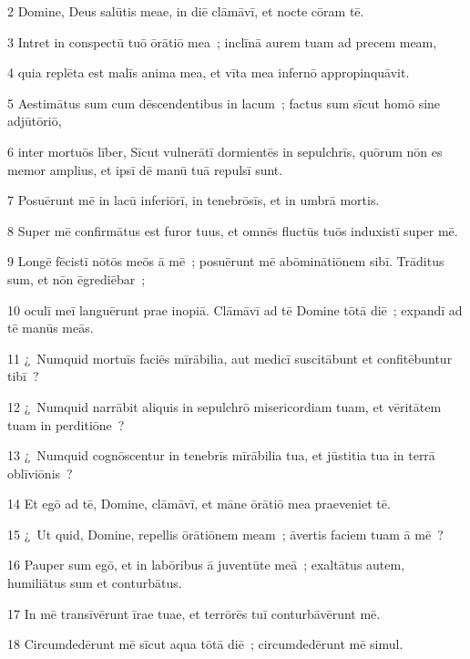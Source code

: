 \psalmVerse
  {\phantom{00}2}
  {Domine, Deus salūtis meae, in diē clāmāvī, et nocte cōram tē.}


\psalmVerse
  {\phantom{00}3}
  {Intret in conspectū tuō ōrātiō mea~; inclīnā aurem tuam ad precem meam,}


\psalmVerse
  {\phantom{00}4}
  {quia replēta est malīs anima mea, et vīta mea infernō appropinquāvit.}


\psalmVerse
  {\phantom{00}5}
  {Aestimātus sum cum dēscendentibus in lacum~; factus sum sīcut homō sine adjūtōriō,}


\psalmVerse
  {\phantom{00}6}
  {inter mortuōs līber, Sīcut vulnerātī dormientēs in sepulchrīs, quōrum nōn es memor amplius, et ipsī dē manū tuā repulsī sunt.}


\psalmVerse
  {\phantom{00}7}
  {Posuērunt mē in lacū inferiōrī, in tenebrōsīs, et in umbrā mortis.}


\psalmVerse
  {\phantom{00}8}
  {Super mē confirmātus est furor tuus, et omnēs fluctūs tuōs induxistī super mē.}


\psalmVerse
  {\phantom{00}9}
  {Longē fēcistī nōtōs meōs ā mē~; posuērunt mē abōminātiōnem sibī. Trāditus sum, et nōn ēgrediēbar~;}


\psalmVerse
  {\phantom{0}10}
  {oculī meī languērunt prae inopiā. Clāmāvī ad tē Domine tōtā diē~; expandī ad tē manūs meās.}


\psalmVerse
  {\phantom{0}11}
  {¿~Numquid mortuīs faciēs mīrābilia, aut medicī suscitābunt et confitēbuntur tibī~?}


\psalmVerse
  {\phantom{0}12}
  {¿~Numquid narrābit aliquis in sepulchrō misericordiam tuam, et vēritātem tuam in perditiōne~?}


\psalmVerse
  {\phantom{0}13}
  {¿~Numquid cognōscentur in tenebrīs mīrābilia tua, et jūstitia tua in terrā oblīviōnis~?}


\psalmVerse
  {\phantom{0}14}
  {Et egō ad tē, Domine, clāmāvī, et māne ōrātiō mea praeveniet tē.}


\psalmVerse
  {\phantom{0}15}
  {¿~Ut quid, Domine, repellis ōrātiōnem meam~; āvertis faciem tuam ā mē~?}


\psalmVerse
  {\phantom{0}16}
  {Pauper sum egō, et in labōribus ā juventūte meā~; exaltātus autem, humiliātus sum et conturbātus.}


\psalmVerse
  {\phantom{0}17}
  {In mē transīvērunt īrae tuae, et terrōrēs tuī conturbāvērunt mē.}


\psalmVerse
  {\phantom{0}18}
  {Circumdedērunt mē sīcut aqua tōtā diē~; circumdedērunt mē simul.}


